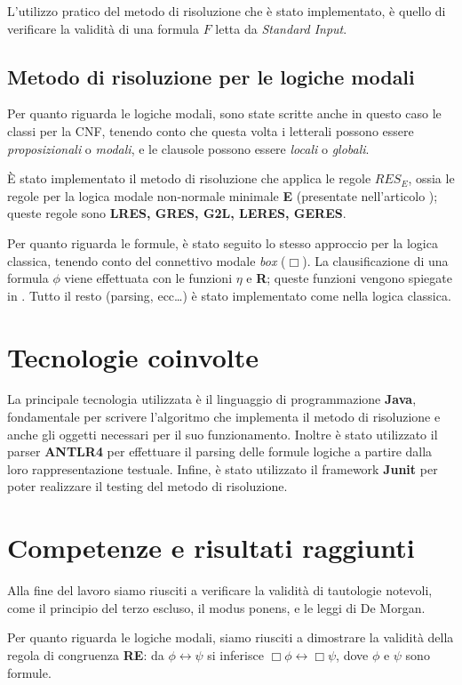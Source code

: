 \documentclass[a4paper,12pt]{article}
\begin{document}
L'utilizzo pratico del metodo di risoluzione che è stato implementato, è quello di verificare la validità di una formula $F$ letta da \emph{Standard Input}.

\subsection*{Metodo di risoluzione per le logiche modali}
Per quanto riguarda le logiche modali, sono state scritte anche in questo caso le classi per la CNF, tenendo conto che questa volta i letterali possono essere \emph{proposizionali} o \emph{modali}, e le clausole possono essere \emph{locali} o \emph{globali}.

\`E stato implementato il metodo di risoluzione che applica le regole $RES_E$, ossia le regole per la logica modale non-normale minimale \textbf{E} (presentate nell'articolo \cite{Articolo_resolution}); queste regole sono \textbf{LRES, GRES, G2L, LERES, GERES}.

Per quanto riguarda le formule, è stato seguito lo stesso approccio per la logica classica, tenendo conto del connettivo modale \emph{box} ($\Box$). La clausificazione di una formula $\phi$ viene effettuata con le funzioni $\eta$ e \textbf{R}; queste funzioni vengono spiegate in \cite{Articolo_resolution}.
Tutto il resto (parsing, ecc\dots) è stato implementato come nella logica classica.

\section{Tecnologie coinvolte}
La principale tecnologia utilizzata è il linguaggio di programmazione \textbf{Java}, fondamentale per scrivere l'algoritmo che implementa il metodo di risoluzione e anche gli oggetti necessari per il suo funzionamento. Inoltre è stato utilizzato il parser \textbf{ANTLR4} per effettuare il parsing delle formule logiche a partire dalla loro rappresentazione testuale. Infine, è stato utilizzato il framework \textbf{Junit} per poter realizzare il testing del metodo di risoluzione.

\section{Competenze e risultati raggiunti}
Alla fine del lavoro siamo riusciti a verificare la validità di tautologie notevoli, come il principio del terzo escluso, il modus ponens, e le leggi di De Morgan.

Per quanto riguarda le logiche modali, siamo riusciti a dimostrare la validità della regola di congruenza \textbf{RE}: da $\phi \leftrightarrow \psi$ si inferisce $\Box\phi \leftrightarrow \Box\psi$, dove $\phi$ e $\psi$ sono formule.



\end{document}
